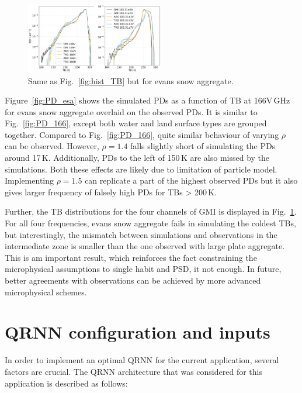 \documentclass[amt, manuscript]{copernicus}
\begin{document}
\begin{figure}[t]
	\includegraphics[width=6cm]{Figures/TB_esa.pdf}
	\caption{ Same as Fig.~\ref{fig:hist_TB} but for evans snow aggregate. }
	\label{fig:TB_esa}
\end{figure}

Figure~\ref{fig:PD_esa} shows the simulated PDs as a function of TB at 166V\,GHz for evans snow aggregate overlaid on the observed PDs. It is similar to Fig.~\ref{fig:PD_166}, except both water and land surface types are grouped together. Compared to Fig.~\ref{fig:PD_166}, quite similar behaviour of varying $\rho$ can be observed. However, $\rho = 1.4$ falls slightly short of simulating the PDs around 17\,K. Additionally, PDs to the left of 150\,K are also missed by the simulations. Both these effects are likely due to limitation of particle model. Implementing $\rho = 1.5$ can replicate a part of the highest observed PDs but it also gives larger frequency of falsely high PDs for TBs > 200\,K. 

Further, the TB distributions for the four channels of GMI is displayed in Fig.~\ref{fig:TB_esa}. For all four frequencies, evans snow aggregate fails in simulating the coldest TBs, but interestingly, the mismatch between simulations and observations in the intermediate zone is smaller than the one observed with large plate aggregate. This is am important result, which reinforces the fact constraining the microphysical assumptions to single habit and PSD, it not enough. In future, better agreements with observations can be achieved by more advanced microphysical schemes.  


\section{QRNN configuration and inputs}
%
\label{app:qrnn_conf}
In order to implement an optimal QRNN for the current application, several factors are crucial. The QRNN architecture that was considered for this application is described as follows:
\end{document}
